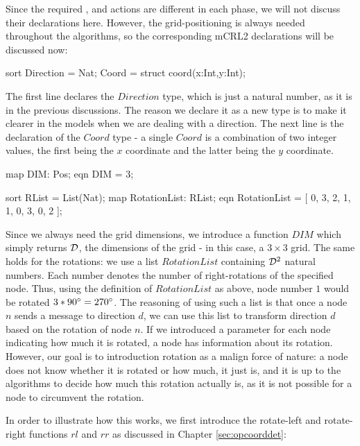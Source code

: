 Since the required ,  and  actions are different in each phase, we will not discuss their declarations here. However, the grid-positioning is always needed throughout the algorithms, so the corresponding mCRL2 declarations will be discussed now:

\begin{codeverb}
sort    Direction = Nat;
        Coord = struct coord(x:Int,y:Int);
\end{codeverb}

The first line declares the $Direction$ type, which is just a natural number, as it is in the previous discussions. The reason we declare it as a new type is to make it clearer in the models when we are dealing with a direction. The next line is the declaration of the $Coord$ type - a single $Coord$ is a combination of two integer values, the first being the $x$ coordinate and the latter being the $y$ coordinate.

\begin{codeverb}
map     DIM: Pos;
eqn     DIM = 3;

sort    RList = List(Nat);
map     RotationList: RList;
eqn     RotationList = [ 0, 3, 2, 1, 1, 0, 3, 0, 2 ];
\end{codeverb}

Since we always need the grid dimensions, we introduce a function $DIM$ which simply returns $\mathcal{D}$, the dimensions of the grid - in this case, a $3 \times 3$ grid. The same holds for the rotations: we use a list $RotationList$ containing $\mathcal{D}^2$ natural numbers. Each number denotes the number of right-rotations of the specified node. Thus, using the definition of $RotationList$ as above, node number $1$ would be rotated $3 * 90 \degree = 270 \degree$. The reasoning of using such a list is that once a node $n$ sends a message to direction $d$, we can use this list to transform direction $d$ based on the rotation of node $n$. If we introduced a parameter for each node indicating how much it is rotated, a node has information about its rotation. However, our goal is to introduction rotation as a malign force of nature: a node does not know whether it is rotated or how much, it just is, and it is up to the algorithms to decide how much this rotation actually is, as it is not possible for a node to circumvent the rotation.

In order to illustrate how this works, we first introduce the rotate-left and rotate-right functions $rl$ and $rr$ as discussed in Chapter \ref{sec:opcoorddet}:

